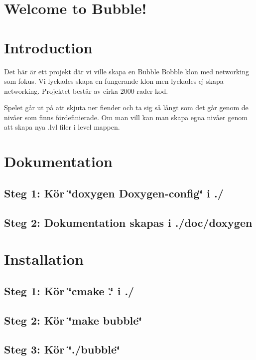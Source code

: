 \hypertarget{index_title}{}\section{Welcome to Bubble!}\label{index_title}
\hypertarget{index_intro_sec}{}\section{Introduction}\label{index_intro_sec}
Det här är ett projekt där vi ville skapa en Bubble Bobble klon med networking som fokus. Vi lyckades skapa en fungerande klon men lyckades ej skapa networking. Projektet består av cirka 2000 rader kod.

Spelet går ut på att skjuta ner fiender och ta sig så långt som det går genom de nivåer som finns fördefinierade. Om man vill kan man skapa egna nivåer genom att skapa nya .lvl filer i level mappen.\hypertarget{index_dokument_sec}{}\section{Dokumentation}\label{index_dokument_sec}
\hypertarget{index_step11}{}\subsection{Steg 1\+: Kör \char`\"{}doxygen Doxygen-\/config\char`\"{} i ./}\label{index_step11}
\hypertarget{index_step12}{}\subsection{Steg 2\+: Dokumentation skapas i ./doc/doxygen}\label{index_step12}
\hypertarget{index_install_sec}{}\section{Installation}\label{index_install_sec}
\hypertarget{index_step21}{}\subsection{Steg 1\+: Kör \char`\"{}cmake .\char`\"{} i ./}\label{index_step21}
\hypertarget{index_step22}{}\subsection{Steg 2\+: Kör \char`\"{}make bubble\char`\"{}}\label{index_step22}
\hypertarget{index_step23}{}\subsection{Steg 3\+: Kör \char`\"{}./bubble\char`\"{}}\label{index_step23}
